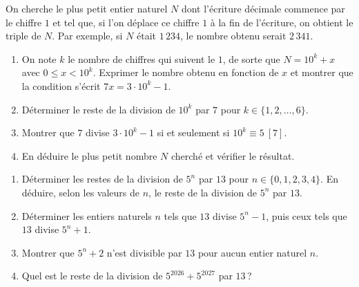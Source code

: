 \begin{exo}\label{exo:arith-34}
      On cherche le plus petit entier naturel $N$ dont l'\'ecriture d\'ecimale commence par le chiffre $1$
      et tel que, si l'on d\'eplace ce chiffre $1$ \`a la fin de l'\'ecriture, on obtient le triple de $N$.
      Par exemple, si $N$ \'etait $1\,234$, le nombre obtenu serait $2\,341$.
      \begin{enumerate}
            \item On note $k$ le nombre de chiffres qui suivent le $1$, de sorte que $N = 10^k + x$ avec $0 \leq x < 10^k$.
                  Exprimer le nombre obtenu en fonction de $x$ et montrer que la condition s'\'ecrit $7 x = 3 \cdot 10^k - 1$.
            \item D\'eterminer le reste de la division de $10^k$ par $7$ pour $k \in \{1, 2, \ldots, 6\}$.
            \item Montrer que $7$ divise $3 \cdot 10^k - 1$ si et seulement si $10^k \equiv 5 \ [7]$.
            \item En d\'eduire le plus petit nombre $N$ cherch\'e et v\'erifier le r\'esultat.
      \end{enumerate}
\end{exo}

\begin{exo}\label{exo:arith-35}
      \begin{enumerate}
            \item D\'eterminer les restes de la division de $5^n$ par $13$ pour $n \in \{0, 1, 2, 3, 4\}$.
                  En d\'eduire, selon les valeurs de $n$, le reste de la division de $5^n$ par $13$.
            \item D\'eterminer les entiers naturels $n$ tels que $13$ divise $5^n - 1$, puis ceux tels que $13$ divise $5^n + 1$.
            \item Montrer que $5^n + 2$ n'est divisible par $13$ pour aucun entier naturel $n$.
            \item Quel est le reste de la division de $5^{2026} + 5^{2027}$ par $13$\,?
      \end{enumerate}
\end{exo}

